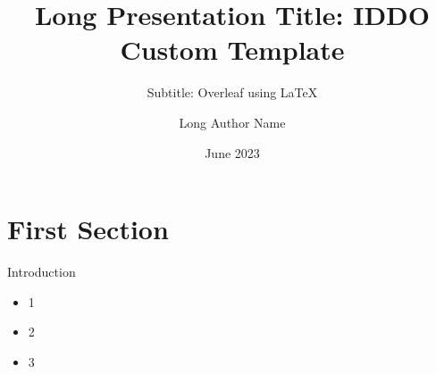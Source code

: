 \documentclass[aspectratio=169]{beamer}
\title[A Short Title]{Long Presentation Title: IDDO Custom Template}
\subtitle{Subtitle: Overleaf using \LaTeX}
\author[Short Author Name]{Long Author Name}
\institute[IDDO]{IDDO, University of Oxford}
\date{June 2023}
\begin{document}
{
\begin{frame}{}
    \titlepage
\end{frame}
}


\section{First Section}
\begin{frame}{Introduction}
    \begin{itemize}
        \item 1
        \item 2
        \item 3
    \end{itemize}
\end{frame}
\end{document}
